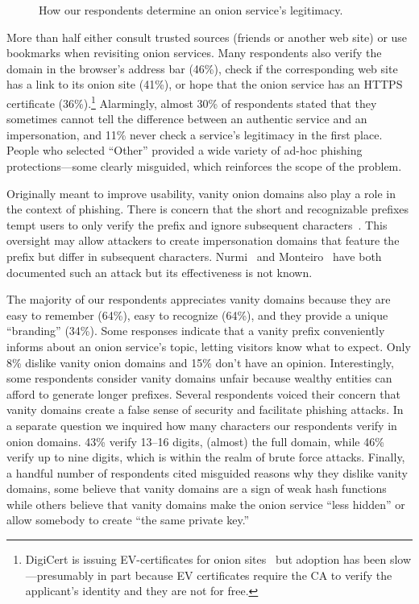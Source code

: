\begin{figure}[t]
    \centering
    
    \caption{How our respondents determine an onion service's legitimacy.}
    \label{fig:determining-legitimacy}
\end{figure}

More than half either consult trusted sources (\eg friends or another web site)
or use bookmarks when revisiting onion services.  Many respondents also verify
the domain in the browser's address bar (46\%), check if the corresponding web
site has a link to its onion site (41\%), or hope that the onion service has an
HTTPS certificate (36\%).\footnote{DigiCert is issuing EV-certificates for onion
sites~\cite{DigiCert2015a} but adoption has been slow---presumably in part
because EV certificates require the CA to verify the applicant's identity
and they are not for free.}  Alarmingly, almost 30\% of respondents stated that
they sometimes cannot tell the difference between an authentic service and an
impersonation, and 11\% never check a service's legitimacy in the first place.
People who selected ``Other'' provided a wide variety of ad-hoc phishing
protections---some clearly misguided, which reinforces the scope of the problem.

Originally meant to improve usability, vanity onion domains also play a role in
the context of phishing.  There is concern that the short and recognizable
prefixes tempt users to only verify the prefix and ignore subsequent
characters~\cite{Winter2015a}.  This oversight may allow attackers to create
impersonation domains that feature the prefix but differ in subsequent
characters.  Nurmi~\cite{Nurmi2015a} and Monteiro~\cite{Monteiro2016a} have both
documented such an attack but its effectiveness is not known.

The majority of our respondents appreciates vanity domains because they are easy
to remember (64\%), easy to recognize (64\%), and they provide a unique
``branding'' (34\%).  Some responses indicate that a vanity prefix conveniently
informs about an onion service's topic, letting visitors know what to expect.
Only 8\% dislike vanity onion domains and 15\% don't have an opinion.
Interestingly, some respondents consider vanity domains unfair because wealthy
entities can afford to generate longer prefixes.  Several respondents voiced
their concern that vanity domains create a false sense of security and
facilitate phishing attacks.  In a separate question we inquired how many
characters our respondents verify in onion domains.  43\% verify 13--16 digits,
\ie (almost) the full domain, while 46\% verify up to nine digits, which is
within the realm of brute force attacks.  Finally, a handful number of
respondents cited misguided reasons why they dislike vanity domains, \eg some
believe that vanity domains are a sign of weak hash functions while others
believe that vanity domains make the onion service ``less hidden'' or allow
somebody to create ``the same private key.''


